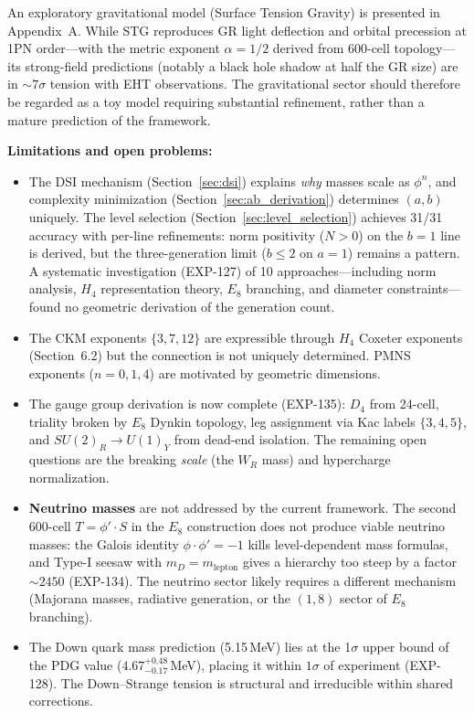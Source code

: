 \documentclass[12pt,a4paper]{article}
\begin{document}
An exploratory gravitational model (Surface Tension Gravity) is presented in Appendix~A. While STG reproduces GR light deflection and orbital precession at 1PN order---with the metric exponent $\alpha = 1/2$ derived from 600-cell topology---its strong-field predictions (notably a black hole shadow at half the GR size) are in $\sim 7\sigma$ tension with EHT observations. The gravitational sector should therefore be regarded as a toy model requiring substantial refinement, rather than a mature prediction of the framework.

\textbf{Limitations and open problems:}
\begin{itemize}
    \item The DSI mechanism (Section~\ref{sec:dsi}) explains \emph{why} masses scale as $\phi^n$, and complexity minimization (Section~\ref{sec:ab_derivation}) determines $(a,b)$ uniquely. The level selection (Section~\ref{sec:level_selection}) achieves 31/31 accuracy with per-line refinements: norm positivity ($N > 0$) on the $b=1$ line is derived, but the three-generation limit ($b \leq 2$ on $a=1$) remains a pattern. A systematic investigation (EXP-127) of 10 approaches---including norm analysis, $H_4$ representation theory, $E_8$ branching, and diameter constraints---found no geometric derivation of the generation count.
    \item The CKM exponents $\{3, 7, 12\}$ are expressible through $H_4$ Coxeter exponents (Section~6.2) but the connection is not uniquely determined. PMNS exponents ($n = 0, 1, 4$) are motivated by geometric dimensions.
    \item The gauge group derivation is now complete (EXP-135): $D_4$ from 24-cell, triality broken by $E_8$ Dynkin topology, leg assignment via Kac labels $\{3,4,5\}$, and $SU(2)_R \to U(1)_Y$ from dead-end isolation. The remaining open questions are the breaking \emph{scale} (the $W_R$ mass) and hypercharge normalization.
    \item \textbf{Neutrino masses} are not addressed by the current framework. The second 600-cell $T = \phi' \cdot S$ in the $E_8$ construction does not produce viable neutrino masses: the Galois identity $\phi \cdot \phi' = -1$ kills level-dependent mass formulas, and Type-I seesaw with $m_D = m_{\text{lepton}}$ gives a hierarchy too steep by a factor $\sim 2450$ (EXP-134). The neutrino sector likely requires a different mechanism (Majorana masses, radiative generation, or the $(1,8)$ sector of $E_8$ branching).
    \item The Down quark mass prediction (5.15\,MeV) lies at the 1$\sigma$ upper bound of the PDG value ($4.67^{+0.48}_{-0.17}$\,MeV), placing it within $1\sigma$ of experiment (EXP-128). The Down--Strange tension is structural and irreducible within shared corrections.

\end{itemize}
\end{document}

